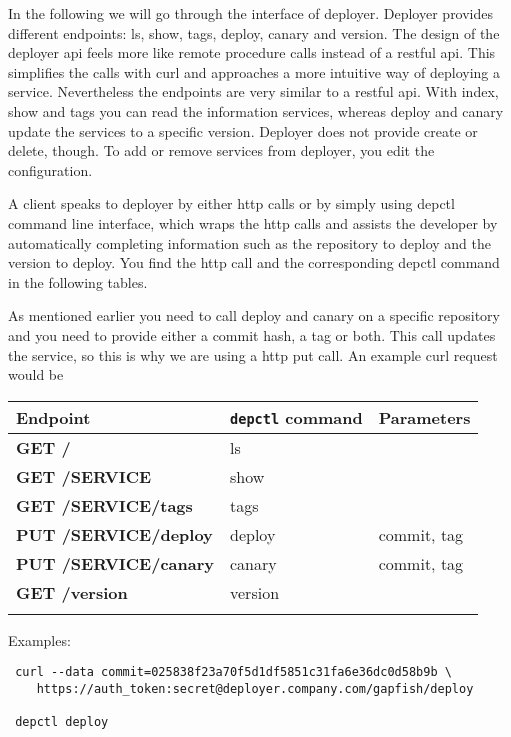In the following we will go through the interface of deployer. Deployer provides different
endpoints: ls, show, tags, deploy, canary and version. The design of the deployer api
feels more like remote procedure calls instead of a restful api. This simplifies the calls
with curl and approaches a more intuitive way of deploying a service. Nevertheless the
endpoints are very similar to a restful api. With index, show and tags you can read the
information services, whereas deploy and canary update the services to a specific
version. Deployer does not provide create or delete, though. To add or remove services
from deployer, you edit the configuration.

A client speaks to deployer by either http calls or by simply using depctl command line
interface, which wraps the http calls and assists the developer by automatically
completing information such as the repository to deploy and the version to deploy. You
find the http call and the corresponding depctl command in the following tables.

As mentioned earlier you need to call deploy and canary on a specific repository and you
need to provide either a commit hash, a tag or both. This call updates the service, so
this is why we are using a http put call. An example curl request would be

\begin{table}[!htbp]
  \begin{tabular}{ l|l|l }
    Endpoint & \texttt{depctl} command & Parameters \\
    \hline \hline
    \textbf{GET /} & ls & \\
    \textbf{GET /SERVICE} & show & \\
    \textbf{GET /SERVICE/tags} & tags & \\
    \textbf{PUT /SERVICE/deploy} & deploy & commit, tag \\
    \textbf{PUT /SERVICE/canary} & canary & commit, tag \\
    \textbf{GET /version} & version & \\
    \multicolumn{3}{l}{} %
  \end{tabular}

  Examples:

\begin{verbatim}
 curl --data commit=025838f23a70f5d1df5851c31fa6e36dc0d58b9b \
    https://auth_token:secret@deployer.company.com/gapfish/deploy

 depctl deploy
\end{verbatim}
\end{table}

